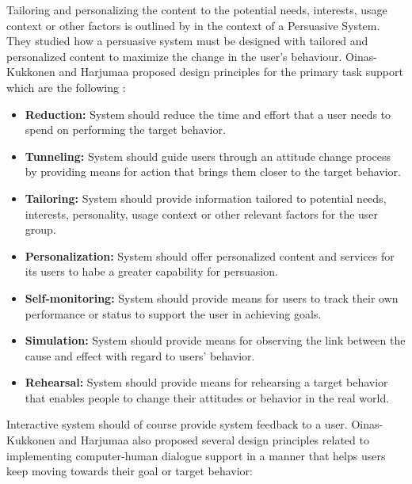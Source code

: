 Tailoring and personalizing the content to the potential needs, interests, usage context or other factors is outlined by \cite{oinas2009persuasive} in the context of a Persuasive System. They studied how a persuasive system must be designed with tailored and personalized content to maximize the change in the user's behaviour. Oinas-Kukkonen and Harjumaa proposed design principles for the primary task support which are the following \cite{oinas2009persuasive}:

\begin{itemize}
	\item \textbf{Reduction:}
	System should reduce the time and effort that a user needs to spend on performing the target behavior.
	\item \textbf{Tunneling:}
	System should guide users through an attitude change process by providing means for action that brings them closer to the target behavior.
	\item \textbf{Tailoring:}
	System should provide information tailored to potential needs, interests, personality, usage context or other relevant factors for the user group.
	\item \textbf{Personalization:}	
	System should offer	personalized content and
	services for its users to habe a greater capability for persuasion.
	\item \textbf{Self-monitoring:}
	System should provide means for users to track their own
	performance or status to support the user in achieving goals.
	\item \textbf{Simulation:}
	System should provide means for observing the link
	between the cause and effect with regard to users’ behavior.
	\item \textbf{Rehearsal:}
	System should provide means for rehearsing a target behavior that enables people to change their attitudes or behavior in the real world.
\end{itemize}

Interactive system should of course provide system feedback to a user. Oinas-Kukkonen and Harjumaa also proposed several design principles related to implementing computer-human dialogue support in a manner that helps users keep moving towards their goal or target behavior: 

